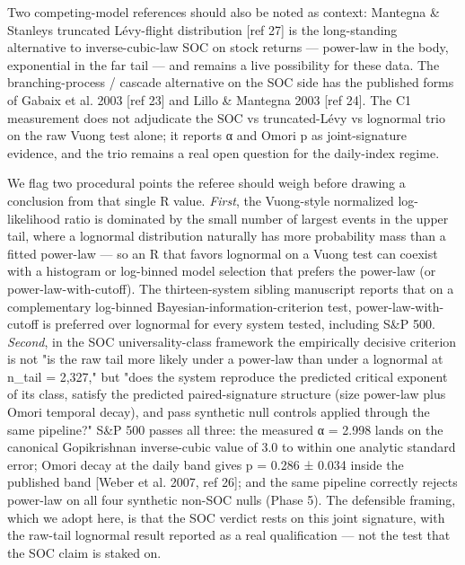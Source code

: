 \documentclass[
  11pt]{article}
\begin{document}
Two competing-model references should also be noted as context: Mantegna
\& Stanley\textquotesingle s truncated Lévy-flight distribution {[}ref
27{]} is the long-standing alternative to inverse-cubic-law SOC on stock
returns --- power-law in the body, exponential in the far tail --- and
remains a live possibility for these data. The branching-process /
cascade alternative on the SOC side has the published forms of Gabaix et
al. 2003 {[}ref 23{]} and Lillo \& Mantegna 2003 {[}ref 24{]}. The C1
measurement does not adjudicate the SOC vs truncated-Lévy vs lognormal
trio on the raw Vuong test alone; it reports α and Omori p as
joint-signature evidence, and the trio remains a real open question for
the daily-index regime.

We flag two procedural points the referee should weigh before drawing a
conclusion from that single R value. \emph{First}, the Vuong-style
normalized log-likelihood ratio is dominated by the small number of
largest events in the upper tail, where a lognormal distribution
naturally has more probability mass than a fitted power-law --- so an R
that favors lognormal on a Vuong test can coexist with a histogram or
log-binned model selection that prefers the power-law (or
power-law-with-cutoff). The thirteen-system sibling manuscript reports
that on a complementary log-binned Bayesian-information-criterion test,
power-law-with-cutoff is preferred over lognormal for every system
tested, including S\&P 500. \emph{Second}, in the SOC universality-class
framework the empirically decisive criterion is not "is the raw tail
more likely under a power-law than under a lognormal at n\_tail =
2,327," but "does the system reproduce the predicted critical exponent
of its class, satisfy the predicted paired-signature structure (size
power-law plus Omori temporal decay), and pass synthetic null controls
applied through the same pipeline?" S\&P 500 passes all three: the
measured α = 2.998 lands on the canonical Gopikrishnan inverse-cubic
value of 3.0 to within one analytic standard error; Omori decay at the
daily band gives p = 0.286 ± 0.034 inside the published band {[}Weber et
al. 2007, ref 26{]}; and the same pipeline correctly rejects power-law
on all four synthetic non-SOC nulls (Phase 5). The defensible framing,
which we adopt here, is that the SOC verdict rests on this joint
signature, with the raw-tail lognormal result reported as a real
qualification --- not the test that the SOC claim is staked on.
\end{document}
